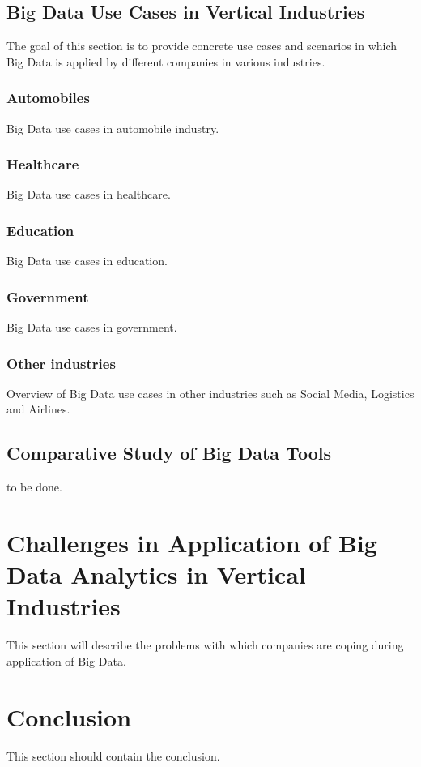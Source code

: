 \documentclass[runningheads]{llncs}
\begin{document}
\subsection{Big Data Use Cases in Vertical Industries}
The goal of this section is to provide concrete use cases and scenarios in which Big Data is applied by different companies in various industries.

\subsubsection{Automobiles}

Big Data use cases in automobile industry.

\subsubsection{Healthcare}

Big Data use cases in healthcare. 

\subsubsection{Education}

Big Data use cases in education.

\subsubsection{Government}

Big Data use cases in government.

\subsubsection{Other industries}

Overview of Big Data use cases in other industries such as Social Media, Logistics and Airlines.

\subsection{Comparative Study of Big Data Tools}

to be done.

\section{Challenges in Application of Big Data Analytics in Vertical Industries}
This section will describe the problems with which companies are coping during application of Big Data.  

\section{Conclusion}
This section should contain the conclusion.


\end{document}
